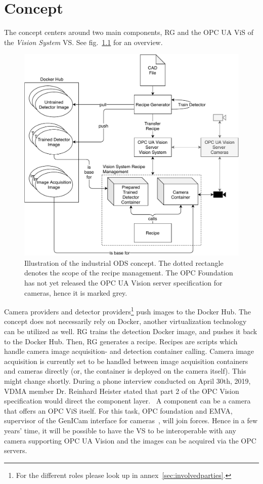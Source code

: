 \chapter{Concept\label{cha:chapter4}}
The concept centers around two main components, RG and the OPC UA ViS of the \textit{Vision System} VS. See fig.~\ref{fig:concept} for an overview. 
\begin{figure}
    \centering
    \includegraphics[width=\textwidth]{img/Concept.pdf}
    \caption[Concept]{Illustration of the industrial ODS concept. The dotted rectangle denotes the scope of the recipe management. The OPC Foundation has not yet released the OPC UA Vision server specification for cameras, hence it is marked grey.}
    \label{fig:concept}
\end{figure}

Camera providers and detector providers\footnote{For the different roles please look up in annex~\ref{sec:involvedparties}.} push images to the Docker Hub.  The concept does not necessarily rely on Docker, another virtualization technology can be utilized as well. RG trains the detection Docker image, and pushes it back to the Docker Hub. Then, RG generates a recipe. Recipes are scripts which handle camera image acquisition- and detection container calling. Camera image acquisition is currently set to be handled between image acquisition containers and cameras directly (or, the container is deployed on the camera itself). This might change shortly. During a phone interview conducted on April 30th, 2019, VDMA member Dr. Reinhard Heister stated that part 2 of the OPC Vision specification would direct the component layer.~\cite{Heister2019OPCFuture} A component can be a camera that offers an OPC ViS itself. For this task, OPC foundation and EMVA, supervisor of the GenICam interface for cameras~\cite{EMVA2019GenICam2019}, will join forces. Hence in a few years' time, it will be possible to have the VS to be interoperable with any camera supporting OPC UA Vision and the images can be acquired via the OPC servers.

